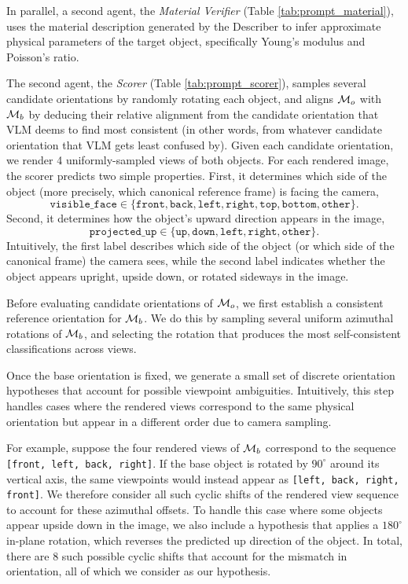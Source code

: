 In parallel, a second agent, the \textit{Material Verifier} (Table \ref{tab:prompt_material}), uses the material description generated by the Describer to infer approximate physical parameters of the target object, specifically Young's modulus and Poisson's ratio.

The second agent, the \textit{Scorer} (Table \ref{tab:prompt_scorer}), samples several candidate orientations by randomly rotating each object, and aligns $\mathcal{M}_o$ with $\mathcal{M}_b$ by deducing their relative alignment from the candidate orientation that VLM deems to find most consistent (in other words, from whatever candidate orientation that VLM gets least confused by). 
Given each candidate orientation, we render 4 uniformly-sampled views of both objects. For each rendered image, the scorer predicts two simple properties. First, it determines which side of the object (more precisely, which canonical reference frame) is facing the camera,
\[
\texttt{visible\_face} \in 
\{\texttt{front},\texttt{back},\texttt{left},\texttt{right},\texttt{top},\texttt{bottom},\texttt{other}\}.
\]
Second, it determines how the object's upward direction appears in the image,
\[
\texttt{projected\_up} \in 
\{\texttt{up},\texttt{down},\texttt{left},\texttt{right},\texttt{other}\}.
\]
Intuitively, the first label describes which side of the object (or which side of the canonical frame) the camera sees, while the second label indicates whether the object appears upright, upside down, or rotated sideways in the image.

Before evaluating candidate orientations of $\mathcal{M}_o$, we first establish a consistent reference orientation for $\mathcal{M}_b$. We do this by sampling several uniform azimuthal rotations of $\mathcal{M}_b$, and selecting the rotation that produces the most self-consistent classifications across views. 

Once the base orientation is fixed, we generate a small set of discrete orientation hypotheses that account for possible viewpoint ambiguities. Intuitively, this step handles cases where the rendered views correspond to the same physical orientation but appear in a different order due to camera sampling.

For example, suppose the four rendered views of $\mathcal{M}_b$ correspond to the sequence
\texttt{[front, left, back, right]}. If the base object is rotated by $90^\circ$ around its vertical axis, the same viewpoints would instead appear as
\texttt{[left, back, right, front]}. We therefore consider all such cyclic shifts of the rendered view sequence to account for these azimuthal offsets. To handle this case where some objects appear upside down in the image, we also include a hypothesis that applies a $180^\circ$ in-plane rotation, which reverses the predicted up direction of the object. In total, there are 8 such possible cyclic shifts that account for the mismatch in orientation, all of which we consider as our hypothesis.

